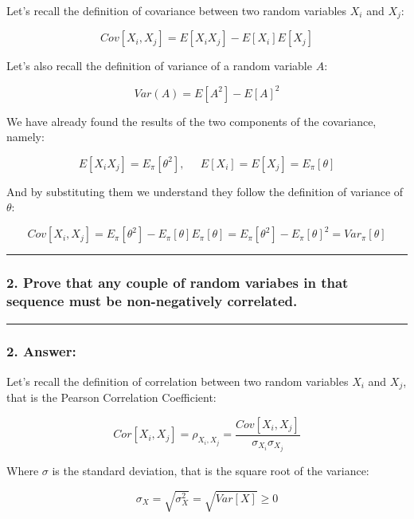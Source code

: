 \documentclass[
]{article}
\begin{document}
Let's recall the definition of covariance between two random variables
\(X_i\) and \(X_j\):

\[
Cov[X_i,X_j] = E[X_iX_j]-E[X_i]E[X_j]
\]

Let's also recall the definition of variance of a random variable \(A\):

\[
Var(A) = E[A^2] - E[A]^2
\]

We have already found the results of the two components of the
covariance, namely:

\[
E[X_iX_j] = E_\pi[\theta^2], \;\;\;\;\;
E[X_i] = E[X_j] = E_\pi[\theta]
\]

And by substituting them we understand they follow the definition of
variance of \(\theta\):

\[
Cov[X_i,X_j] = E_\pi[\theta^2] - E_\pi[\theta]E_\pi[\theta]
= E_\pi[\theta^2] - E_\pi[\theta]^2
= Var_\pi[\theta]
\]

\begin{center}\rule{0.5\linewidth}{0.5pt}\end{center}

\hypertarget{prove-that-any-couple-of-random-variabes-in-that-sequence-must-be-non-negatively-correlated.}{%
\subsubsection{2. Prove that any couple of random variabes in that
sequence must be non-negatively
correlated.}\label{prove-that-any-couple-of-random-variabes-in-that-sequence-must-be-non-negatively-correlated.}}

\begin{center}\rule{0.5\linewidth}{0.5pt}\end{center}

\hypertarget{answer-11}{%
\subsubsection{2. Answer:}\label{answer-11}}

Let's recall the definition of correlation between two random variables
\(X_i\) and \(X_j\), that is the Pearson Correlation Coefficient:

\[
Cor[X_i, X_j] = \rho_{X_i,X_j} = \frac{Cov[X_i, X_j]}{\sigma_{X_i}\sigma_{X_j}}
\]

Where \(\sigma\) is the standard deviation, that is the square root of
the variance:

\[
\sigma_X = \sqrt{\sigma^2_X}=\sqrt{Var[X]}\ge0
\]
\end{document}
